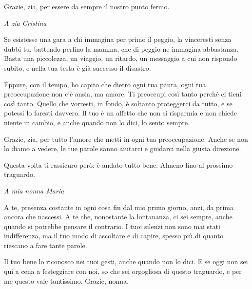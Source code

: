 Grazie, zia, per essere da sempre il nostro punto fermo.\par

\vspace{5mm}
\textit{A zia Cristina}\par
\vspace{2mm}
Se esistesse una gara a chi immagina per primo il peggio, la vinceresti senza dubbi tu, battendo perfino la mamma, che di peggio ne immagina abbastanza. Basta una piccolezza, un viaggio, un ritardo, un messaggio a cui non rispondo subito, e nella tua testa è già successo il disastro.\par

Eppure, con il tempo, ho capito che dietro ogni tua paura, ogni tua preoccupazione non c'è ansia, ma amore. Ti preoccupi così tanto perché ci tieni così tanto. Quello che vorresti, in fondo, è soltanto proteggerci da tutto, e se potessi lo faresti davvero. Il tuo è un affetto che non si risparmia e non chiede niente in cambio, e anche quando non lo dici, lo sento sempre.\par

Grazie, zia, per tutto l'amore che metti in ogni tua preoccupazione. Anche se non lo diamo a vedere, le tue parole sanno aiutarci e guidarci nella giusta direzione.\par

Questa volta ti rassicuro però: è andato tutto bene. Almeno fino al prossimo traguardo.\par

\clearpage
\vspace{5mm}
\textit{A mia nonna Maria}\par
\vspace{2mm}
A te, presenza costante in ogni cosa fin dal mio primo giorno, anzi, da prima ancora che nascessi. A te che, nonostante la lontananza, ci sei sempre, anche quando si potrebbe pensare il contrario. I tuoi silenzi non sono mai stati indifferenza, ma il tuo modo di ascoltare e di capire, spesso più di quanto riescano a fare tante parole.\par

Il tuo bene lo riconosco nei tuoi gesti, anche quando non lo dici. E se oggi non sei qui a cena a festeggiare con noi, so che sei orgogliosa di questo traguardo, e per me questo vale tantissimo. Grazie, nonna.\par

